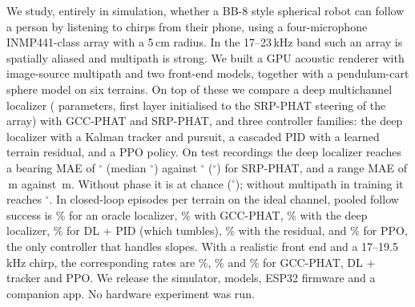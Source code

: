 We study, entirely in simulation, whether a BB-8 style spherical robot can follow a person by
listening to chirps from their phone, using a four-microphone INMP441-class array with a 5\,cm
radius. In the 17--23\,kHz band such an array is spatially aliased and multipath is strong. We
built a GPU acoustic renderer with image-source multipath and two front-end models, together
with a pendulum-cart sphere model on six terrains. On top of these we compare a deep
multichannel localizer (\TrainFullParams{} parameters, first layer initialised to the SRP-PHAT
steering of the array) with GCC-PHAT and SRP-PHAT, and three controller families: the deep
localizer with a Kalman tracker and pursuit, a cascaded PID with a learned terrain residual,
and a PPO policy. On \NTestSet{} test recordings the deep localizer reaches a bearing MAE of
\LocdlfullBMAE$^\circ$ (median \LocdlfullBMed$^\circ$) against \LocsrpphatBMAE$^\circ$
(\LocsrpphatBMed$^\circ$) for SRP-PHAT, and a range MAE of \LocdlfullRMAE\,m against
\LocsrpphatRMAE\,m. Without phase it is at chance (\LocdlmagBMAE$^\circ$); without multipath in
training it reaches \LocdlanechoicBMAE$^\circ$. In \CLAusN{} closed-loop episodes per terrain
on the ideal channel, pooled follow success is \CLAusoraclesucc\% for an oracle localizer,
\CLAusgcctracksucc\% with GCC-PHAT, \CLAusdltracksucc\% with the deep localizer,
\CLAusdlpidsucc\% for DL + PID (which tumbles), \CLAusdlpidressucc\% with the residual, and
\CLAusrlsucc\% for PPO, the only controller that handles slopes. With a realistic front end and
a 17--19.5\,kHz chirp, the corresponding rates are \CLBfbgcctracksucc\%, \CLBfbdltracksucc\%
and \CLBfbrlsucc\% for GCC-PHAT, DL + tracker and PPO. We release the simulator, models,
ESP32 firmware and a companion app. No hardware experiment was run.
